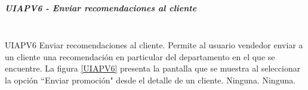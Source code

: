 \subparagraph{UIAPV6 - Enviar recomendaciones al cliente} ~\\

{UIAPV6} %
{Enviar recomendaciones al cliente.}  %
{Permite al usuario vendedor enviar a un cliente una recomendación en particular del departamento en el que se encuentre.} %
{La figura \ref{UIAPV6} presenta la pantalla que se muestra al seleccionar la opción ``Enviar promoción" desde el detalle de un cliente.} %
{Ninguna.} %
{Ninguna.} %


